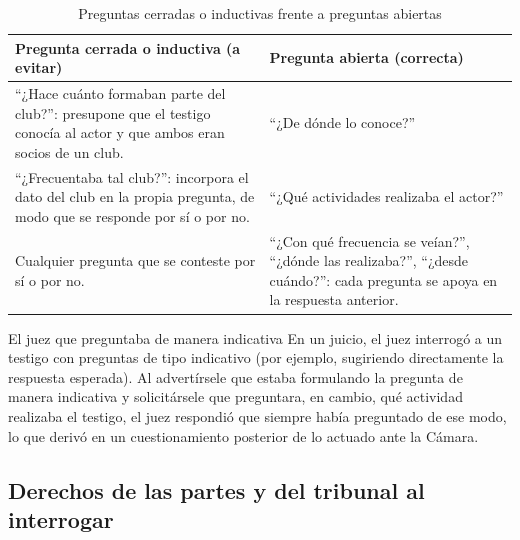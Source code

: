 \documentclass[12pt,oneside]{book}
\begin{document}
\begin{table}[H]
\centering
\caption{Preguntas cerradas o inductivas frente a preguntas abiertas}
\begin{tabularx}{\textwidth}{>{\raggedright\arraybackslash}X >{\raggedright\arraybackslash}X}
\toprule
\textbf{Pregunta cerrada o inductiva (a evitar)} & \textbf{Pregunta abierta (correcta)} \\
\midrule
``¿Hace cuánto formaban parte del club?'': presupone que el testigo conocía al actor y que ambos eran socios de un club. & ``¿De dónde lo conoce?'' \\
``¿Frecuentaba tal club?'': incorpora el dato del club en la propia pregunta, de modo que se responde por sí o por no. & ``¿Qué actividades realizaba el actor?'' \\
Cualquier pregunta que se conteste por sí o por no. & ``¿Con qué frecuencia se veían?'', ``¿dónde las realizaba?'', ``¿desde cuándo?'': cada pregunta se apoya en la respuesta anterior. \\
\bottomrule
\end{tabularx}
\end{table}

\begin{example}{El juez que preguntaba de manera indicativa}
En un juicio, el juez interrogó a un testigo con preguntas de tipo indicativo (por ejemplo, sugiriendo directamente la respuesta esperada). Al advertírsele que estaba formulando la pregunta de manera indicativa y solicitársele que preguntara, en cambio, qué actividad realizaba el testigo, el juez respondió que siempre había preguntado de ese modo, lo que derivó en un cuestionamiento posterior de lo actuado ante la Cámara.
\end{example}

\subsection{Derechos de las partes y del tribunal al interrogar}
\end{document}
